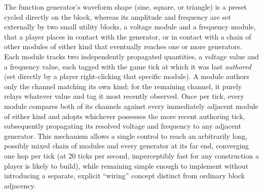 The function generator's waveform shape (sine, square, or triangle) is a preset cycled
directly on the block, whereas its amplitude and frequency are set externally by two small
utility blocks, a voltage module and a frequency module, that a player places in contact
with the generator, or in contact with a chain of other modules of either kind that
eventually reaches one or more generators. Each module tracks two independently propagated
quantities, a voltage value and a frequency value, each tagged with the game tick at which
it was last \emph{authored} (set directly by a player right-clicking that specific module).
A module authors only the channel matching its own kind; for the remaining channel, it
purely relays whatever value and tag it most recently observed. Once per tick, every module
compares both of its channels against every immediately adjacent module of either kind and
adopts whichever possesses the more recent authoring tick, subsequently propagating its
resolved voltage and frequency to any adjacent generator. This mechanism allows a single
control to reach an arbitrarily long, possibly mixed chain of modules and every generator at
its far end, converging one hop per tick (at 20 ticks per second, imperceptibly fast for any
construction a player is likely to build), while remaining simple enough to implement
without introducing a separate, explicit ``wiring'' concept distinct from ordinary block
adjacency.
